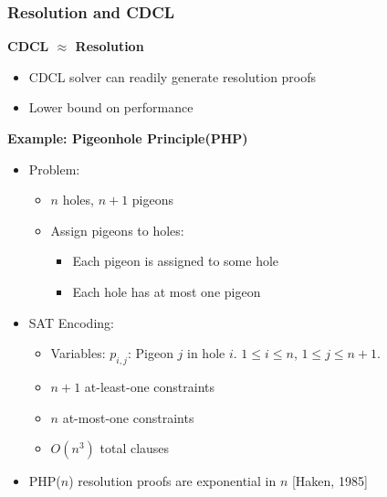 \documentclass[t,pdf]{beamer}
\begin{document}
\begin{frame}
  \frametitle{Resolution and CDCL}
  
{\bf CDCL $\approx$ Resolution}
\begin{itemize}
\item {}CDCL solver can readily generate resolution  proofs 
\item {}Lower bound on performance
\end{itemize}
\medskip

{\bf Example: Pigeonhole Principle(PHP)}
\begin{itemize}
\item Problem:
  \begin{itemize}
    \item $n$ holes, $n+1$ pigeons
    \item Assign pigeons to holes:
      \begin{itemize}
      \item Each pigeon is assigned to some hole
      \item Each hole has at most one pigeon
      \end{itemize}
  \end{itemize}
 \item SAT Encoding:
   \begin{itemize}
     \item Variables: $p_{i,j}$: Pigeon $j$ in hole $i$.  $1 \leq i \leq n$, $1 \leq j \leq n+1$. 
     \item $n+1$ at-least-one constraints
     \item $n$ at-most-one constraints
     \item $O(n^3)$ total clauses
   \end{itemize}
\item PHP($n$) resolution proofs are exponential in $n$ [Haken, 1985]
\end{itemize}

\end{frame}
\end{document}
